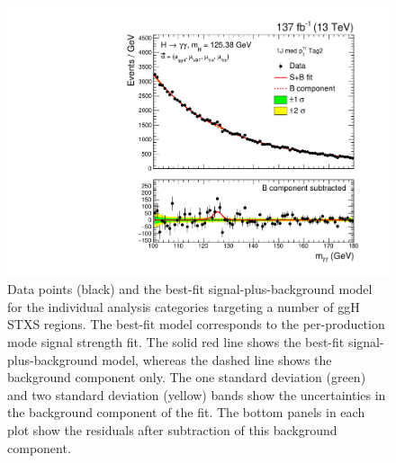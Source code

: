 \begin{figure}
  \includegraphics[width=.32\linewidth]{Figures/app_sb_models/RECO_1J_PTH_60_120_Tag2_CMS_hgg_mass.pdf}
  \caption[Observed diphoton mass distributions: ggH 0J and ggH 1J]
  {
    Data points (black) and the best-fit signal-plus-background model for the individual analysis categories targeting a number of ggH STXS regions. The best-fit model corresponds to the per-production mode signal strength fit. The solid red line shows the best-fit signal-plus-background model, whereas the dashed line shows the background component only. The one standard deviation (green) and two standard deviation (yellow) bands show the uncertainties in the background component of the fit. The bottom panels in each plot show the residuals after subtraction of this background component.
  }
  \label{fig:diphoton_mass_0}
\end{figure}

